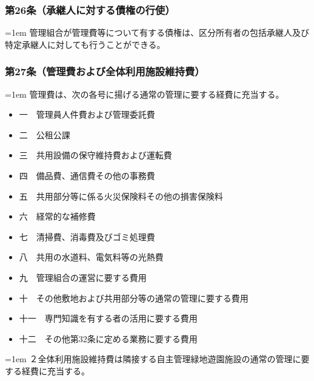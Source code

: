 \documentclass[
  twoside,
  luatex,
  paper=a4paper,
  fontsize=11pt,
  jafontsize=11pt,
  jlreq_notes,
]{jlreq}
\newcommand{\joumain}[1]{%
  \noindent\hangindent=1em\hangafter=1
  \hspace{1em}#1%
}
\newcommand{\kou}[2]{%
  \par\noindent\hangindent=1em\hangafter=1
  #1\hspace{1em}#2%
}
\begin{document}
  \subsubsection*{第26条（承継人に対する債権の行使）}
  \joumain{管理組合が管理費等について有する債権は、区分所有者の包括承継人及び特定承継人に対しても行うことができる。}

  \subsubsection*{第27条（管理費および全体利用施設維持費）}
  \joumain{管理費は、次の各号に揚げる通常の管理に要する経費に充当する。}
  \begin{itemize}[label={}, leftmargin=3em, itemindent=-2em]
    \item 一　管理員人件費および管理委託費
    \item 二　公租公課
    \item 三　共用設備の保守維持費および運転費
    \item 四　備品費、通信費その他の事務費
    \item 五　共用部分等に係る火災保険料その他の損害保険料
    \item 六　経常的な補修費
    \item 七　清掃費、消毒費及びゴミ処理費
    \item 八　共用の水道料、電気料等の光熱費
    \item 九　管理組合の運営に要する費用
    \item 十　その他敷地および共用部分等の通常の管理に要する費用
    \item 十一　専門知識を有する者の活用に要する費用
    \item 十二　その他第32条に定める業務に要する費用
  \end{itemize}
  \kou{２}{全体利用施設維持費は隣接する自主管理緑地遊園施設の通常の管理に要する経費に充当する。}
\end{document}
